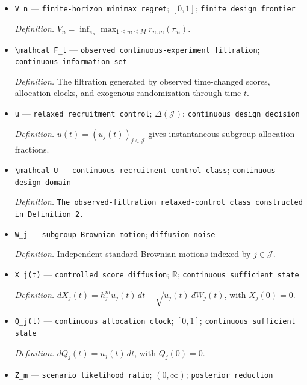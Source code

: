 \documentclass{article}
\begin{document}
\begin{itemize}
  \par\smallskip\noindent\emph{Definition.} \(r_{n,m}(\pi_n)=L_n(\pi_n,m)-c_{n,m}\).
  \item \texttt{V\_\allowbreak{}n} --- \texttt{finite-\allowbreak{}horizon minimax regret}; \([0,1]\); \texttt{finite design frontier}
  \par\smallskip\noindent\emph{Definition.} \(V_n=\inf_{\pi_n}\max_{1\leq m\leq M}r_{n,m}(\pi_n)\).
  \item \texttt{\textbackslash{}\allowbreak{}mathcal F\_\allowbreak{}t} --- \texttt{observed continuous-\allowbreak{}experiment filtration}; \texttt{continuous information set}
  \par\smallskip\noindent\emph{Definition.} The filtration generated by observed time-changed scores, allocation clocks, and exogenous randomization through time \(t\).
  \item \texttt{u} --- \texttt{relaxed recruitment control}; \(\Delta(\mathcal J)\); \texttt{continuous design decision}
  \par\smallskip\noindent\emph{Definition.} \(u(t)=(u_j(t))_{j\in\mathcal J}\) gives instantaneous subgroup allocation fractions.
  \item \texttt{\textbackslash{}\allowbreak{}mathcal U} --- \texttt{continuous recruitment-\allowbreak{}control class}; \texttt{continuous design domain}
  \par\smallskip\noindent\emph{Definition.} \texttt{The observed-\allowbreak{}filtration relaxed-\allowbreak{}control class constructed in Definition 2.}
  \item \texttt{W\_\allowbreak{}j} --- \texttt{subgroup Brownian motion}; \texttt{diffusion noise}
  \par\smallskip\noindent\emph{Definition.} Independent standard Brownian motions indexed by \(j\in\mathcal J\).
  \item \texttt{X\_\allowbreak{}j(t)} --- \texttt{controlled score diffusion}; \(\mathbb R\); \texttt{continuous sufficient state}
  \par\smallskip\noindent\emph{Definition.} \(dX_j(t)=h_j^m u_j(t)\,dt+\sqrt{u_j(t)}\,dW_j(t)\), with \(X_j(0)=0\).
  \item \texttt{Q\_\allowbreak{}j(t)} --- \texttt{continuous allocation clock}; \([0,1]\); \texttt{continuous sufficient state}
  \par\smallskip\noindent\emph{Definition.} \(dQ_j(t)=u_j(t)\,dt\), with \(Q_j(0)=0\).
  \item \texttt{Z\_\allowbreak{}m} --- \texttt{scenario likelihood ratio}; \((0,\infty)\); \texttt{posterior reduction}

\end{itemize}
\end{document}
